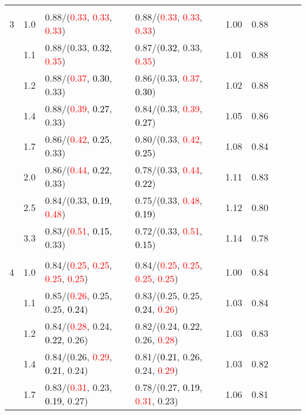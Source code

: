 \documentclass[10pt,a4paper]{report}
\begin{document}
\begin{table}[!htbp]
\begin{center}
{\begin{tabular}{ccllccccc}
			&&&&\\
			3			&1.0&0.88/(\textcolor{red}{0.33}, \textcolor{red}{0.33}, \textcolor{red}{0.33})&0.88/(\textcolor{red}{0.33}, \textcolor{red}{0.33}, \textcolor{red}{0.33})&1.00&0.88\\
			&1.1&0.88/(0.33, \textcolor{black}{0.32}, \textcolor{red}{0.35})&0.87/(\textcolor{black}{0.32}, 0.33, \textcolor{red}{0.35})&1.01&0.88\\
			&1.2&0.88/(\textcolor{red}{0.37}, \textcolor{black}{0.30}, 0.33)&0.86/(0.33, \textcolor{red}{0.37}, \textcolor{black}{0.30})&1.02&0.88\\
			&1.4&0.88/(\textcolor{red}{0.39}, \textcolor{black}{0.27}, 0.33)&0.84/(0.33, \textcolor{red}{0.39}, \textcolor{black}{0.27})&1.05&0.86\\
			&1.7&0.86/(\textcolor{red}{0.42}, \textcolor{black}{0.25}, 0.33)&0.80/(0.33, \textcolor{red}{0.42}, \textcolor{black}{0.25})&1.08&0.84\\
			&2.0&0.86/(\textcolor{red}{0.44}, \textcolor{black}{0.22}, 0.33)&0.78/(0.33, \textcolor{red}{0.44}, \textcolor{black}{0.22})&1.11&0.83\\
			&2.5&0.84/(0.33, \textcolor{black}{0.19}, \textcolor{red}{0.48})&0.75/(0.33, \textcolor{red}{0.48}, \textcolor{black}{0.19})&1.12&0.80\\
			&3.3&0.83/(\textcolor{red}{0.51}, \textcolor{black}{0.15}, 0.33)&0.72/(0.33, \textcolor{red}{0.51}, \textcolor{black}{0.15})&1.14&0.78\\
			&&&&\\
			4			&1.0&0.84/(\textcolor{red}{0.25}, \textcolor{red}{0.25}, \textcolor{red}{0.25}, \textcolor{red}{0.25})&0.84/(\textcolor{red}{0.25}, \textcolor{red}{0.25}, \textcolor{red}{0.25}, \textcolor{red}{0.25})&1.00&0.84\\
			&1.1&0.85/(\textcolor{red}{0.26}, 0.25, 0.25, \textcolor{black}{0.24})&0.83/(0.25, 0.25, \textcolor{black}{0.24}, \textcolor{red}{0.26})&1.03&0.84\\
			&1.2&0.84/(\textcolor{red}{0.28}, 0.24, \textcolor{black}{0.22}, 0.26)&0.82/(0.24, \textcolor{black}{0.22}, 0.26, \textcolor{red}{0.28})&1.03&0.83\\
			&1.4&0.84/(0.26, \textcolor{red}{0.29}, \textcolor{black}{0.21}, 0.24)&0.81/(\textcolor{black}{0.21}, 0.26, 0.24, \textcolor{red}{0.29})&1.03&0.82\\
			&1.7&0.83/(\textcolor{red}{0.31}, 0.23, \textcolor{black}{0.19}, 0.27)&0.78/(0.27, \textcolor{black}{0.19}, \textcolor{red}{0.31}, 0.23)&1.06&0.81\\

\end{tabular}}
\end{center}
\end{table}
\end{document}
